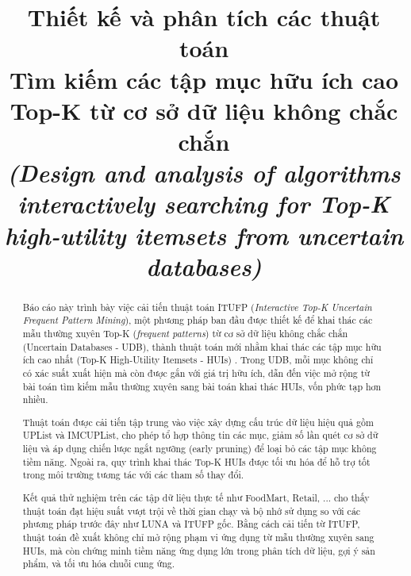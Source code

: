 \documentclass[conference]{IEEEtran}
\begin{document}
\justifying

\title{Thiết kế và phân tích các thuật toán\\
Tìm kiếm các tập mục hữu ích cao Top-K từ cơ sở dữ liệu không chắc chắn\\
\small{\textit{(Design and analysis of algorithms interactively searching for Top-K high-utility itemsets from uncertain databases)}}}

\author{
}

\maketitle

\begin{abstract}
Báo cáo này trình bày việc cải tiến thuật toán ITUFP\cite{ITUFP} (\textit{Interactive Top-K Uncertain Frequent Pattern Mining}), một phương pháp ban đầu được thiết kế để khai thác các mẫu thường xuyên Top-K (\textit{frequent patterns}) từ cơ sở dữ liệu không chắc chắn (Uncertain Databases - UDB)\cite{Uncertain data mining}, thành thuật toán mới nhằm khai thác các tập mục hữu ích cao nhất (Top-K High-Utility Itemsets - HUIs) \cite{HUIs}. Trong UDB, mỗi mục không chỉ có xác suất xuất hiện mà còn được gắn với giá trị hữu ích, dẫn đến việc mở rộng từ bài toán tìm kiếm mẫu thường xuyên sang bài toán khai thác HUIs, vốn phức tạp hơn nhiều.

Thuật toán được cải tiến tập trung vào việc xây dựng cấu trúc dữ liệu hiệu quả gồm UPList và IMCUPList, cho phép tổ hợp thông tin các mục, giảm số lần quét cơ sở dữ liệu và áp dụng chiến lược ngắt ngưỡng (early pruning) để loại bỏ các tập mục không tiềm năng. Ngoài ra, quy trình khai thác Top-K HUIs được tối ưu hóa để hỗ trợ tốt trong môi trường tương tác với các tham số thay đổi.

Kết quả thử nghiệm trên các tập dữ liệu thực tế như FoodMart, Retail, ... cho thấy thuật toán đạt hiệu suất vượt trội về thời gian chạy và bộ nhớ sử dụng so với các phương pháp trước đây như LUNA \cite{ILUNA} và ITUFP gốc. Bằng cách cải tiến từ ITUFP, thuật toán đề xuất không chỉ mở rộng phạm vi ứng dụng từ mẫu thường xuyên sang HUIs, mà còn chứng minh tiềm năng ứng dụng lớn trong phân tích dữ liệu, gợi ý sản phẩm, và tối ưu hóa chuỗi cung ứng.
\end{abstract}
\end{document}
